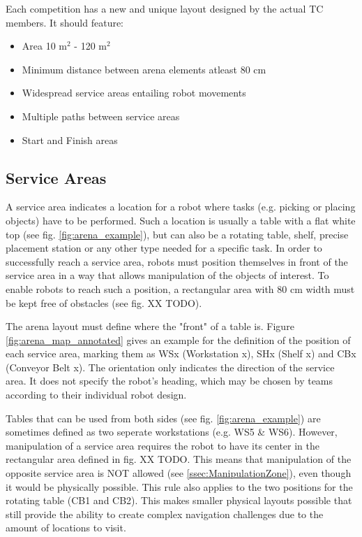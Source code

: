 Each competition has a new and unique layout designed by the actual TC members.
It should feature:
\begin{itemize}
\item Area 10 m$^2$ - 120 m$^2$
\item Minimum distance between arena elements atleast 80 cm 
\item Widespread service areas entailing robot movements
\item Multiple paths between service areas
\item Start and Finish areas
\end{itemize}


\subsection{Service Areas} 
\label{subsec: serviceareas}

A service area indicates a location for a robot where tasks (e.g. picking or placing objects) have to be performed.
Such a location is usually a table with a flat white top (see fig. \ref{fig:arena_example}), but can also be a rotating table, shelf, precise placement station or any other type needed for a specific task.
In order to successfully reach a service area, robots must position themselves in front of the service area in a way that allows manipulation of the objects of interest. To enable robots to reach such a position, a rectangular area with 80 cm width must be kept free of obstacles (see fig. XX TODO). 

The arena layout must define where the "front" of a table is.
Figure \ref{fig:arena_map_annotated} gives an example for the definition of the position of each service area, marking them as WSx (Workstation x), SHx (Shelf x) and CBx (Conveyor Belt x). The orientation only indicates the direction of the service area. It does not specify the robot's heading, which may be chosen by teams according to their individual robot design.


Tables that can be used from both sides (see fig. \ref{fig:arena_example}) are sometimes defined as two seperate workstations (e.g. WS5 \& WS6). However, manipulation of a service area requires the robot to have its center in the rectangular area defined in fig. XX TODO. This means that manipulation of the opposite service area is NOT allowed (see \ref{ssec:ManipulationZone}), even though it would be physically possible.
This rule also applies to the two positions for the rotating table (CB1 and CB2).
This makes smaller physical layouts possible that still provide the ability to create complex navigation challenges due to the amount of locations to visit.

